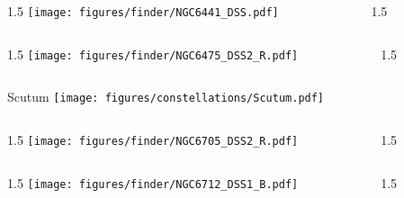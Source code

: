 \documentclass[final]{beamer}
\newlength{\colwidth}
\begin{document}

\begin{frame}[t]{}
  \begin{columns}[T]
    \begin{column}{1.5\colwidth}
      \centering
      \texttt{[image: figures/finder/NGC6441\_DSS.pdf]}
    \end{column}
    \begin{column}{1.5\colwidth}
      \Large
      
    \end{column}
  \end{columns}
  \vspace{\fill}
  \begin{columns}[T]
    \begin{column}{1.5\colwidth}
      \centering
      \texttt{[image: figures/finder/NGC6475\_DSS2\_R.pdf]}
    \end{column}
    \begin{column}{1.5\colwidth}
      \Large
      
    \end{column}
  \end{columns}
\end{frame}


\begin{frame}[t]{\LARGE Scutum}
  \centering
  \texttt{[image: figures/constellations/Scutum.pdf]}
\end{frame}


\begin{frame}[t]{}
  \begin{columns}[T]
    \begin{column}{1.5\colwidth}
      \centering
      \texttt{[image: figures/finder/NGC6705\_DSS2\_R.pdf]}
    \end{column}
    \begin{column}{1.5\colwidth}
      \Large
      
    \end{column}
  \end{columns}
  \vspace{\fill}
  \begin{columns}[T]
    \begin{column}{1.5\colwidth}
      \centering
      \texttt{[image: figures/finder/NGC6712\_DSS1\_B.pdf]}
    \end{column}
    \begin{column}{1.5\colwidth}
      \Large
      
    \end{column}
  \end{columns}
\end{frame}
\end{document}
